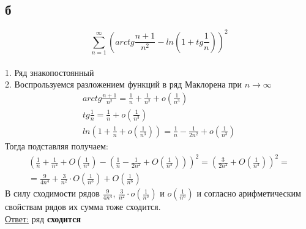 \documentclass[a5paper, 10pt]{article}
\theoremstyle{definition}
\theoremstyle{plain}
\theoremstyle{remark}
\begin{document}
\subsection{б}
\begin{equation}
\sum \limits_{n = 1}^{\infty} \left( arctg \frac{n+1}{n^2} - ln \left(1+ tg \frac{1}{n} \right) \right)^2
\end{equation}
\\
1. Ряд знакопостоянный\\
2. Воспрользуемся разложением функций в ряд Маклорена при $n \to \infty$
\begin{gather*}
arctg \frac {n+1}{n^2} = \frac {1}{n} + \frac {1}{n^2}  + o\left( \frac{1}{n^3} \right) \\
tg \frac{1}{n} =  \frac {1}{n}  + o\left( \frac{1}{n^3} \right)\\
ln \left(1 +  \frac {1}{n}  + o\left( \frac{1}{n^3} \right)\right) =  \frac {1}{n} -  \frac{1}{2n^2}  + o\left( \frac{1}{n^3} \right)
\end{gather*}
Тогда подставляя получаем:
\begin{multline}
\left(  \frac {1}{n} + \frac {1}{n^2}  + O\left( \frac{1}{n^3} \right) - \left(  \frac {1}{n} -  \frac{1}{2n^2}  + O\left( \frac{1}{n^3} \right)\right) \right)^2 = \left(  \frac {3}{2n^2}  + O\left( \frac{1}{n^3} \right) \right)^2 =\\
= \frac{9}{4n^4} +  \frac{3}{n^2} \cdot  O\left( \frac{1}{n^3} \right)+ O\left( \frac{1}{n^6} \right)
\end{multline}
В силу сходимости рядов $\frac{9}{4n^4} $, $\frac{3}{n^2} \cdot  o\left( \frac{1}{n^3} \right)$ и $o\left( \frac{1}{n^6} \right)$ и согласно арифметическим свойствам рядов их сумма тоже сходится.\\

\underline{Ответ:} ряд  \textbf{сходится}
\end{document}
